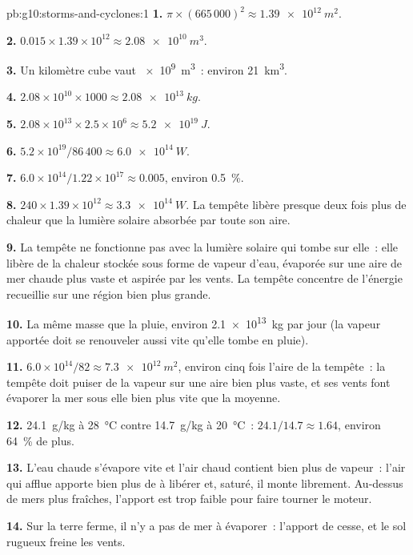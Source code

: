 \begin{solution}{pb:g10:storms-and-cyclones:1}
\textbf{1.} $\pi \times (665\,000)^2 \approx \qty{1.39e12}{m^2}$.

\textbf{2.} $0.015 \times 1.39\times10^{12} \approx \qty{2.08e10}{m^3}$.

\textbf{3.} Un kilomètre cube vaut \qty{e9}{m^3}~: environ \qty{21}{km^3}.

\textbf{4.} $2.08\times10^{10} \times 1000 \approx \qty{2.08e13}{kg}$.

\textbf{5.} $2.08\times10^{13} \times 2.5\times10^6 \approx \qty{5.2e19}{J}$.

\textbf{6.} $5.2\times10^{19}/86\,400 \approx \qty{6.0e14}{W}$.

\textbf{7.} $6.0\times10^{14}/1.22\times10^{17} \approx 0.005$, environ
\qty{0.5}{\percent}.

\textbf{8.} $240 \times 1.39\times10^{12} \approx \qty{3.3e14}{W}$. La tempête
libère presque deux fois plus de chaleur que la lumière solaire absorbée par
toute son aire.

\textbf{9.} La tempête ne fonctionne pas avec la lumière solaire qui tombe
sur elle~: elle libère de la chaleur stockée sous forme de vapeur d'eau,
évaporée sur une aire de mer chaude plus vaste et aspirée par les vents. La
tempête concentre de l'énergie recueillie sur une région bien plus grande.

\textbf{10.} La même masse que la pluie, environ \qty{2.1e13}{kg} par jour
(la vapeur apportée doit se renouveler aussi vite qu'elle tombe en pluie).

\textbf{11.} $6.0\times10^{14}/82 \approx \qty{7.3e12}{m^2}$, environ cinq fois
l'aire de la tempête~: la tempête doit puiser de la vapeur sur une aire bien
plus vaste, et ses vents font évaporer la mer sous elle bien plus vite que
la moyenne.

\textbf{12.} \qty{24.1}{g/kg} à \qty{28}{\degreeCelsius} contre
\qty{14.7}{g/kg} à \qty{20}{\degreeCelsius}~: $24.1/14.7 \approx 1.64$,
environ \qty{64}{\percent} de plus.

\textbf{13.} L'eau chaude s'évapore vite et l'air chaud contient bien plus
de vapeur~: l'air qui afflue apporte bien plus de  à libérer
et, saturé, il monte librement. Au-dessus de mers plus fraîches, l'apport
est trop faible pour faire tourner le moteur.

\textbf{14.} Sur la terre ferme, il n'y a pas de mer à évaporer~: l'apport
de  cesse, et le sol rugueux freine les vents.


\end{solution}
